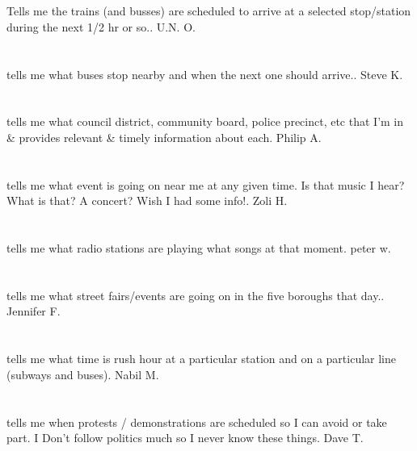 \section{} Tells me the trains (and busses) are scheduled to arrive at a selected stop/station during the next 1/2 hr or so.. U.N. O.
\section{}tells me what buses stop nearby and when the next one should arrive.. Steve K.
\section{}tells me what council district,  community board,  police precinct,  etc that I'm in \& provides relevant \& timely information about each. Philip A.
\section{}tells me what event is going on near me at any given time. Is that music I hear? What is that? A concert? Wish I had some info!. Zoli H.
\section{} tells me what radio stations are playing what songs at that moment. peter w.
\section{}tells me what street fairs/events are going on in the five boroughs that day.. Jennifer F.
\section{}tells me what time is rush hour at a particular station and on a particular line (subways and buses). Nabil M.
\section{} tells me when protests / demonstrations are scheduled so I can avoid or take part. I Don't follow politics much so I never know these things. Dave T.
